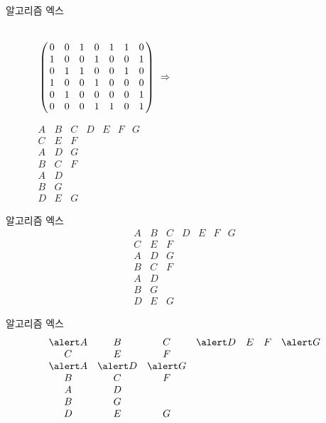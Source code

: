 \documentclass[xcolor=svgnames]{beamer}
\let\a\alert
\begin{document}
%
\begin{frame}{알고리즘 엑스}
  \begin{center}
    \Large\boldmath
    \begin{figure}[!htb]
      \hskip-17mm\begin{minipage}{.7\textwidth}
      \centering
      $\bordermatrix{
        \strut&&&&&&&\cr
        &0&0&1&0&1&1&0\cr
        &1&0&0&1&0&0&1\cr
        &0&1&1&0&0&1&0\cr
        &1&0&0&1&0&0&0\cr
        &0&1&0&0&0&0&1\cr
        &0&0&0&1&1&0&1}\ \Rightarrow$
      \end{minipage}%
      \begin{minipage}{.3\textwidth}
        \centering
        $
        \begin{array}{ccccccc}
          A & B & C & D & E & F & G\\
          C & E & F &&&&\\
          A & D & G &&&&\\
          B & C & F &&&&\\
          A & D &&&&&\\
          B & G &&&&&\\
          D & E & G &&&&
        \end{array}
        $
      \end{minipage}
    \end{figure}
  \end{center}
\end{frame}

\renewcommand\arraystretch{1.2}

%
\begin{frame}{알고리즘 엑스}
\Large\boldmath
  $$
  \begin{array}{ccccccc}
    A & B & C & D & E & F & G\\
    C & E & F &&&&\\
    A & D & G &&&&\\
    B & C & F &&&&\\
    A & D &&&&&\\
    B & G &&&&&\\
    D & E & G &&&&
  \end{array}
  $$
\end{frame}

%
\begin{frame}{알고리즘 엑스}
\Large\boldmath
  $$
  \begin{array}{ccccccc}
    \a A & B & C & \a D & E & F & \a G\\
    C & E & F &&&&\\
    \a A & \a D & \a G &&&&\\
    B & C & F &&&&\\
    A & D &&&&&\\
    B & G &&&&&\\
    D & E & G &&&&
  \end{array}
  $$
\end{frame}
\end{document}
